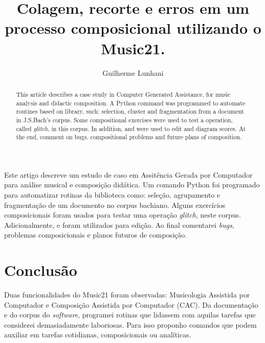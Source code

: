 \documentclass[12pt]{article}
\title{Colagem, recorte e erros em um processo composicional utilizando o Music21.}
\author{Guilherme Lunhani\inst{1}}
\begin{document}
\maketitle

\begin{abstract}
This article describes a case study in Computer Generated Assistance, for music analysis and didactic composition. A Python command was programmed to automate routines based on \cite{music21_2015} library, such: selection, cluster and fragmentation from a document in J.S.Bach's corpus. Some compositional exercises were used to test a operation, called \emph{glitch}, in this corpus. In addition, \cite{musescore_2015} and \cite{lilypond_2015} were used to edit and diagram scores. At the end, comment on bugs, compositional problems and future plans of composition.
\end{abstract}

\begin{resumo}
Este artigo descreve um estudo de caso em Assitência Gerada por Computador para análise musical e composição didática. Um comando {Python} foi programado para automatizar rotinas da biblioteca \cite{music21_2015} como: seleção, agrupamento e fragmentação de um documento no corpus bachiano. Alguns exercícios composicionais foram usados para testar uma operação \emph{glitch}, neste corpus. Adicionalmente,  \cite{musescore_2015} e \cite{lilypond_2015} foram utilizados para edição. Ao final comentarei \emph{bugs}, problemas composicionais  e planos futuros de composição.
\end{resumo}







\section{Conclusão}\label{sec:conclusao}

Duas funcionalidades do Music21 foram observadas: Musicologia Assistida por Computador  e Composição Assistida por Computador (CAC).  Da documentação e do corpus do \emph{software}, programei rotinas que lidassem com aquilas tarefas que considerei demasiadamente laboriosas. Para isso proponho comandos que  podem auxiliar em tarefas cotidianas, composicionais ou analíticas. 
\end{document}
